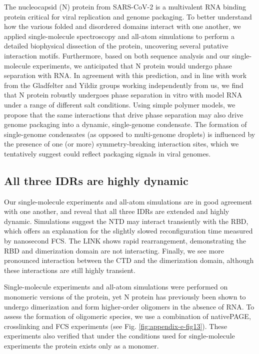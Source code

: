 \documentclass[../main.tex]{subfiles}
\begin{document}
        The nucleocapsid (N) protein from SARS-CoV-2 is a multivalent RNA binding protein critical for viral replication and genome packaging\cite{masters_coronavirus_2019,Laude1995-bx}. To better understand how the various folded and disordered domains interact with one another, we applied single-molecule spectroscopy and all-atom simulations to perform a detailed biophysical dissection of the protein, uncovering several putative interaction motifs. Furthermore, based on both sequence analysis and our single-molecule experiments, we anticipated that N protein would undergo phase separation with RNA. In agreement with this prediction, and in line with work from the Gladfelter and Yildiz groups working independently from us, we find that N protein robustly undergoes phase separation in vitro with model RNA under a range of different salt conditions. Using simple polymer models, we propose that the same interactions that drive phase separation may also drive genome packaging into a dynamic, single-genome condensate. The formation of single-genome condensates (as opposed to multi-genome droplets) is influenced by the presence of one (or more) symmetry-breaking interaction sites, which we tentatively suggest could reflect packaging signals in viral genomes.

    \subsection{All three IDRs are highly dynamic}
        Our single-molecule experiments and all-atom simulations are in good agreement with one another, and reveal that all three IDRs are extended and highly dynamic. Simulations suggest the NTD may interact transiently with the RBD, which offers an explanation for the slightly slowed reconfiguration time measured by nanosecond FCS. The LINK shows rapid rearrangement, demonstrating the RBD and dimerization domain are not interacting. Finally, we see more pronounced interaction between the CTD and the dimerization domain, although these interactions are still highly transient. 

        Single-molecule experiments and all-atom simulations were performed on monomeric versions of the protein, yet N protein has previously been shown to undergo dimerization and form higher-order oligomers in the absence of RNA\cite{Chang2013-th}. To assess the formation of oligomeric species, we use a combination of nativePAGE, crosslinking and FCS experiments (see Fig. \ref{fig:appendix-e-fig13}). These experiments also verified that under the conditions used for single-molecule experiments the protein exists only as a monomer. 
\end{document}
